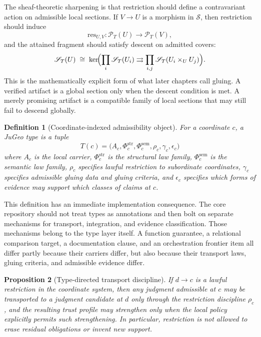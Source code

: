 \documentclass[11pt]{report}
\newtheorem{definition}{Definition}[chapter]
\newtheorem{proposition}[definition]{Proposition}
\begin{document}
The sheaf-theoretic sharpening is that restriction should define a contravariant action on admissible local sections. If $V \to U$ is a morphism in $\mathcal{S}$, then restriction should induce
\[
\mathrm{res}_{U,V} : \mathscr{P}_T(U) \to \mathscr{P}_T(V),
\]
and the attained fragment should satisfy descent on admitted covers:
\[
\mathscr{S}_T(U) \;\cong\; \ker\!\Bigl(
\prod_i \mathscr{S}_T(U_i) \rightrightarrows \prod_{i,j}\mathscr{S}_T(U_i\times_U U_j)
\Bigr).
\]
This is the mathematically explicit form of what later chapters call gluing. A verified artifact is a global section only when the descent condition is met. A merely promising artifact is a compatible family of local sections that may still fail to descend globally.

\begin{definition}[Coordinate-indexed admissibility object]
For a coordinate $c$, a JuGeo type is a tuple
\[
T(c)=\bigl(A_c,\Phi^{\mathrm{str}}_c,\Phi^{\mathrm{sem}}_c,\rho_c,\gamma_c,\epsilon_c\bigr)
\]
where $A_c$ is the local carrier, $\Phi^{\mathrm{str}}_c$ is the structural law family, $\Phi^{\mathrm{sem}}_c$ is the semantic law family, $\rho_c$ specifies lawful restriction to subordinate coordinates, $\gamma_c$ specifies admissible gluing data and gluing criteria, and $\epsilon_c$ specifies which forms of evidence may support which classes of claims at $c$.
\end{definition}

This definition has an immediate implementation consequence. The core repository should not treat types as annotations and then bolt on separate mechanisms for transport, integration, and evidence classification. Those mechanisms belong to the type layer itself. A function guarantee, a relational comparison target, a documentation clause, and an orchestration frontier item all differ partly because their carriers differ, but also because their transport laws, gluing criteria, and admissible evidence differ.

\begin{proposition}[Type-directed transport discipline]
If $d \to c$ is a lawful restriction in the coordinate system, then any judgment admissible at $c$ may be transported to a judgment candidate at $d$ only through the restriction discipline $\rho_c$, and the resulting trust profile may strengthen only when the local policy explicitly permits such strengthening. In particular, restriction is not allowed to erase residual obligations or invent new support.
\end{proposition}
\end{document}
